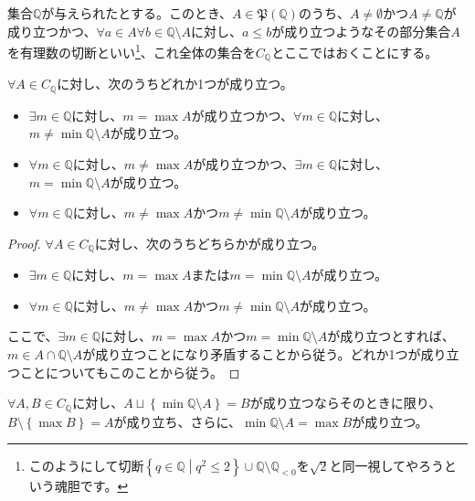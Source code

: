 \documentclass[dvipdfmx]{jsarticle}
\begin{document}
\begin{dfn}[有理数の切断]
集合$\mathbb{Q}$が与えられたとする。このとき、$A \in \mathfrak{P}\left( \mathbb{Q} \right)$のうち、$A \neq \emptyset$かつ$A \neq \mathbb{Q}$が成り立つかつ、$\forall a \in A\forall b \in \mathbb{Q} \setminus A$に対し、$a \leq b$が成り立つようなその部分集合$A$を有理数の切断といい\footnote{このようにして切断$\left\{ q \in \mathbb{Q} \middle| q^{2} \leq 2 \right\} \cup \mathbb{Q} \setminus \mathbb{Q}_{< 0}$を$\sqrt{2}$と同一視してやろうという魂胆です。}、これ全体の集合を$C_{\mathbb{Q}}$とここではおくことにする。
\end{dfn}
\begin{thm}\label{1.2.6.22}
$\forall A \in C_{\mathbb{Q}}$に対し、次のうちどれか1つが成り立つ。
\begin{itemize}
\item
  $\exists m \in \mathbb{Q}$に対し、$m = \max A$が成り立つかつ、$\forall m \in \mathbb{Q}$に対し、$m \neq \min{\mathbb{Q} \setminus A}$が成り立つ。
\item
  $\forall m \in \mathbb{Q}$に対し、$m \neq \max A$が成り立つかつ、$\exists m \in \mathbb{Q}$に対し、$m = \min{\mathbb{Q} \setminus A}$が成り立つ。
\item
  $\forall m \in \mathbb{Q}$に対し、$m \neq \max A$かつ$m \neq \min{\mathbb{Q} \setminus A}$が成り立つ。
\end{itemize}
\end{thm}
\begin{proof}
$\forall A \in C_{\mathbb{Q}}$に対し、次のうちどちらかが成り立つ。
\begin{itemize}
\item
  $\exists m \in \mathbb{Q}$に対し、$m = \max A$または$m = \min{\mathbb{Q} \setminus A}$が成り立つ。
\item
  $\forall m \in \mathbb{Q}$に対し、$m \neq \max A$かつ$m \neq \min{\mathbb{Q} \setminus A}$が成り立つ。
\end{itemize}
ここで、$\exists m \in \mathbb{Q}$に対し、$m = \max A$かつ$m = \min{\mathbb{Q} \setminus A}$が成り立つとすれば、$m \in A \cap \mathbb{Q} \setminus A$が成り立つことになり矛盾することから従う。どれか1つが成り立つことについてもこのことから従う。
\end{proof}
\begin{thm}\label{1.2.6.23}
$\forall A,B \in C_{\mathbb{Q}}$に対し、$A \sqcup \left\{ \min{\mathbb{Q} \setminus A} \right\} = B$が成り立つならそのときに限り、$B \setminus \left\{ \max B \right\} = A$が成り立ち、さらに、$\min{\mathbb{Q} \setminus A} = \max B$が成り立つ。
\end{thm}
\end{document}
